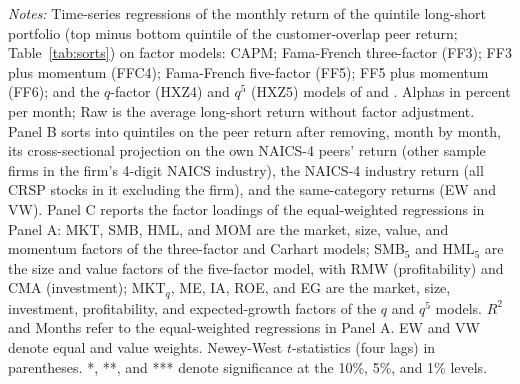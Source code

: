 \begin{table}[!htbp]
\par\vspace{4pt}\begin{minipage}{\linewidth}\scriptsize \emph{Notes:} Time-series regressions of the monthly return of the quintile long-short portfolio (top minus bottom quintile of the customer-overlap peer return; Table~\ref{tab:sorts}) on factor models: CAPM; Fama-French three-factor (FF3); FF3 plus momentum (FFC4); Fama-French five-factor (FF5); FF5 plus momentum (FF6); and the $q$-factor (HXZ4) and $q^5$ (HXZ5) models of \citet{HouXueZhang2015} and \citet{HouMoXueZhang2021}. Alphas in percent per month; Raw is the average long-short return without factor adjustment. Panel B sorts into quintiles on the peer return after removing, month by month, its cross-sectional projection on the own NAICS-4 peers' return (other sample firms in the firm's 4-digit NAICS industry), the NAICS-4 industry return (all CRSP stocks in it excluding the firm), and the same-category returns (EW and VW). Panel C reports the factor loadings of the equal-weighted regressions in Panel A: MKT, SMB, HML, and MOM are the market, size, value, and momentum factors of the three-factor and Carhart models; SMB$_5$ and HML$_5$ are the size and value factors of the five-factor model, with RMW (profitability) and CMA (investment); MKT$_q$, ME, IA, ROE, and EG are the market, size, investment, profitability, and expected-growth factors of the $q$ and $q^5$ models. $R^2$ and Months refer to the equal-weighted regressions in Panel A. EW and VW denote equal and value weights. Newey-West $t$-statistics (four lags) in parentheses. *, **, and *** denote significance at the 10\%, 5\%, and 1\% levels.\end{minipage}
\end{table}